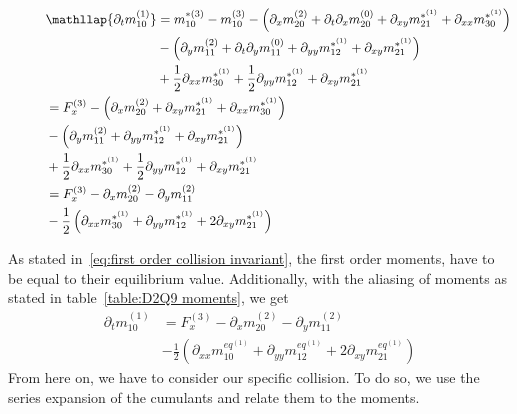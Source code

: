 \begin{align}
  \phantom{\partial_t m_{10}^{(1)}}
  &\begin{aligned}
  \nonumber
    \mathllap{\partial_t m_{10}^{(1)}} & =
    m_{10}^{*(3)} - m_{10}^{(3)}
    - \left(\partial_x m_{20}^{(2)} + \partial_t\partial_x m_{20}^{(0)} + \partial_{xy} m_{21}^{*^{(1)}} + \partial_{xx} m_{30}^{*^{(1)}}\right) \\
    &
    - \left(\partial_y m_{11}^{(2)} + \partial_t\partial_y m_{11}^{(0)} + \partial_{yy} m_{12}^{*^{(1)}} + \partial_{xy} m_{21}^{*^{(1)}}\right) \\
    &
    + \frac{1}{2}\partial_{xx} m_{30}^{*^{(1)}} + \frac{1}{2} \partial_{yy} m_{12}^{*^{(1)}} + \partial_{xy} m_{21}^{*^{(1)}}
  \end{aligned} \\
  &\begin{aligned}
  \nonumber
   & =
    F_x^{(3)}
    - \left(\partial_x m_{20}^{(2)} + \partial_{xy} m_{21}^{*^{(1)}} + \partial_{xx} m_{30}^{*^{(1)}}\right) \\
    &
    - \left(\partial_y m_{11}^{(2)} + \partial_{yy} m_{12}^{*^{(1)}} + \partial_{xy} m_{21}^{*^{(1)}}\right) \\
    &
    + \frac{1}{2}\partial_{xx} m_{30}^{*^{(1)}} + \frac{1}{2} \partial_{yy} m_{12}^{*^{(1)}} + \partial_{xy} m_{21}^{*^{(1)}}
  \end{aligned}\\
%
  &\begin{aligned}
  \nonumber
   & =
    F_x^{(3)}
    - \partial_x m_{20}^{(2)} - \partial_y m_{11}^{(2)}   \\
    &
    - \frac{1}{2} \left(\partial_{xx} m_{30}^{*^{(1)}} + \partial_{yy} m_{12}^{*^{(1)}} + 2\partial_{xy} m_{21}^{*^{(1)}}\right)
  \end{aligned}
\end{align}

As stated in~\eqref{eq:first order collision invariant}, the first order moments, have to be equal to their equilibrium value. Additionally, with the aliasing of moments as stated in table~\ref{table:D2Q9 moments}, we get
\begin{equation}
  \begin{aligned}
  \partial_t m_{10}^{(1)}
   & =
    F_x^{(3)}
    - \partial_x m_{20}^{(2)} - \partial_y m_{11}^{(2)} \\
    &
    - \frac{1}{2} \left(\partial_{xx} m_{10}^{eq^{(1)}} + \partial_{yy} m_{12}^{eq^{(1)}} + 2\partial_{xy} m_{21}^{eq^{(1)}}\right)
  \end{aligned}
\end{equation}
From here on, we have to consider our specific collision. To do so, we use the series expansion of the cumulants and relate them to the moments.
